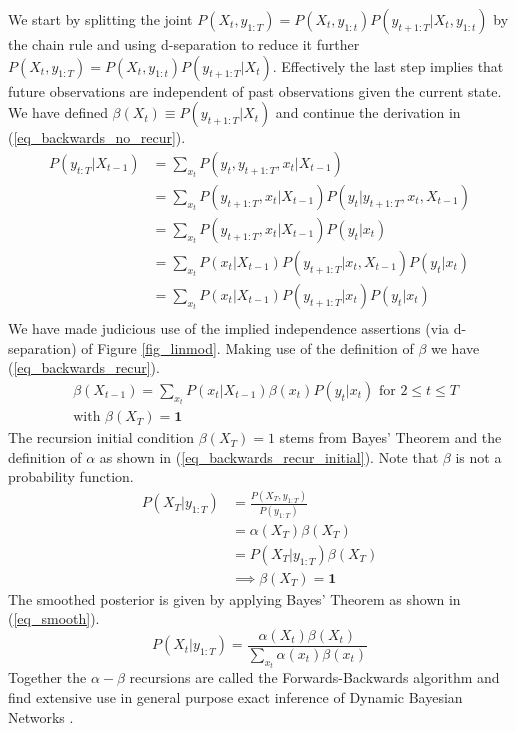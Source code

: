 \documentclass[../masters.tex]{subfiles}
\begin{document}
We start by splitting the joint $P(X_t, y_{1:T}) = P(X_t, y_{1:t})P(y_{t+1:T}|X_t,y_{1:t})$ by the chain rule and using d-separation to reduce it further $P(X_t, y_{1:T}) = P(X_t, y_{1:t})P(y_{t+1:T}|X_t)$. Effectively the last step implies that future observations are independent of past observations given the current state. We have defined $\beta(X_t)\equiv P(y_{t+1:T}|X_t)$ and continue the derivation in (\ref{eq_backwards_no_recur}).
\begin{equation}
\begin{aligned}
P(y_{t:T}|X_{t-1}) &= \sum_{x_t} P(y_t, y_{t+1:T}, x_t|X_{t-1}) \\
&= \sum_{x_t} P(y_{t+1:T}, x_t | X_{t-1})P(y_t| y_{t+1:T}, x_t, X_{t-1}) \\
&= \sum_{x_t} P(y_{t+1:T}, x_t | X_{t-1})P(y_t| x_t) \\
&= \sum_{x_t} P(x_t | X_{t-1})P(y_{t+1:T}| x_t,X_{t-1})P(y_t| x_t) \\
&= \sum_{x_t} P(x_t | X_{t-1})P(y_{t+1:T}| x_t)P(y_t| x_t) \\
\end{aligned}
\label{eq_backwards_no_recur}
\end{equation}
We have made judicious use of the implied independence assertions (via d-separation) of Figure \ref{fig_linmod}. Making use of the definition of $\beta$ we have (\ref{eq_backwards_recur}).
\begin{equation}
\begin{aligned}
&\beta(X_{t-1}) = \sum_{x_t} P(x_t | X_{t-1})\beta(x_t)P(y_t| x_t) \text{ for } 2 \leq t \leq T \\
&\text{with } \beta(X_T) = \mathbf{1}
\end{aligned}
\label{eq_backwards_recur}
\end{equation}
The recursion initial condition $\beta(X_T) = 1$ stems from Bayes' Theorem and the definition of $\alpha$ as shown in (\ref{eq_backwards_recur_initial}). Note that $\beta$ is not a probability function.
\begin{equation}
\begin{aligned}
P(X_T|y_{1:T}) &= \frac{P(X_T, y_{1:T})}{P(y_{1:T})} \\
&= \alpha(X_T) \beta(X_T)\\
&= P(X_T| y_{1:T}) \beta(X_T)\\
&\implies \beta(X_T) = \mathbf{1}
\end{aligned}
\label{eq_backwards_recur_initial}
\end{equation}
The smoothed posterior is given by applying Bayes' Theorem as shown in (\ref{eq_smooth}).
\begin{equation}
P(X_t|y_{1:T}) = \frac{\alpha(X_t)\beta(X_t)}{\sum_{x_t}\alpha(x_t)\beta(x_t)}
\label{eq_smooth}
\end{equation}
Together the $\alpha - \beta$ recursions are called the Forwards-Backwards algorithm and find extensive use in general purpose exact inference of Dynamic Bayesian Networks \cite{murphy1}.
\end{document}
